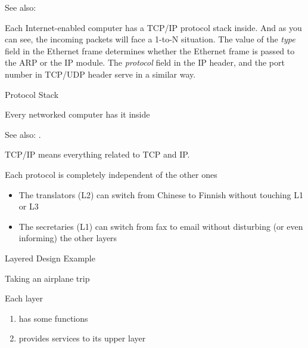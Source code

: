 See also: 

Each Internet-enabled computer has a TCP/IP protocol stack inside. And as you can see, the
incoming packets will face a 1-to-N situation. The value of the \emph{type} field in the
Ethernet frame determines whether the Ethernet frame is passed to the ARP or the IP
module. The \emph{protocol} field in the IP header, and the port number in TCP/UDP header
serve in a similar way.

\begin{frame}{{\tcpip{}} Protocol Stack}
  \begin{iblock}{Every networked computer has it inside}
    \begin{center}
    \end{center}
  \end{iblock}
\end{frame}

See also: .

TCP/IP means everything related to TCP and IP.

\begin{frame}
  \begin{minipage}{.6\linewidth}
    \centering%
    \label{fig:translator}%
  \end{minipage}\quad
  \begin{minipage}{.35\linewidth}
    Each protocol is completely independent of the other ones
    \begin{itemize}
    \item The translators (L2) can switch from Chinese to Finnish without touching L1 or
      L3
    \item The secretaries (L1) can switch from fax to email without disturbing (or even
      informing) the other layers
    \end{itemize}
  \end{minipage}
\end{frame}

\begin{frame}{Layered Design Example}
  \begin{minipage}{.5\linewidth}
    \begin{iblock}{Taking an airplane trip}
      \mode<beamer>{ \texttt{[image: airtrip]} }%
    \end{iblock}
  \end{minipage}\qquad
  \begin{minipage}{.4\linewidth}
    Each layer
    \begin{enumerate}
    \item has some functions
    \item provides services to its upper layer
    \end{enumerate}
  \end{minipage}
\end{frame}

